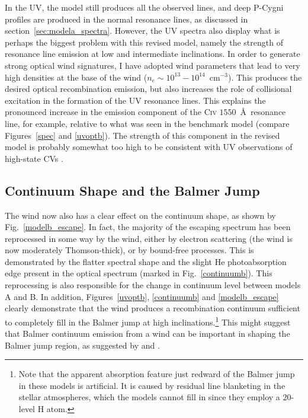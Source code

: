 In the UV, the model still produces all the observed lines, 
and deep P-Cygni profiles are produced in the normal resonance lines,
as discussed in section~\ref{sec:modela_spectra}. However, the UV spectra also
display what is perhaps the biggest problem with this revised model,
namely the strength of resonance line emission 
at low and intermediate inclinations.
In order to generate strong optical wind signatures, I have adopted wind
parameters that lead to very high densities at the base of the wind
($n_e\sim10^{13}-10^{14}$~cm$^{-3}$). This produces
the desired optical recombination emission, but also increases the
role of collisional excitation in the formation of the UV resonance
lines. This explains the pronounced increase in the emission component 
of the C\textsc{iv} $1550$~\AA\ resonance line, for example, relative to
what was seen in the benchmark model (compare Figures~\ref{spec} and
\ref{uvoptb}). The strength of this component in the revised model 
is probably somewhat too high to be consistent with UV observations 
of high-state CVs \citep[see e.g.][]{long1991,long1994, noebauer}.


\subsection{Continuum Shape and the Balmer Jump}

The wind now also has a clear effect on the continuum shape,
as shown by Fig.~\ref{modelb_escape}. In fact, the majority of the
escaping spectrum has been reprocessed in some way by the wind,
either by electron scattering (the wind is now moderately Thomson-thick),
or by bound-free processes. This is demonstrated by the flatter spectral shape
and the slight He photoabsorption edge present in the optical spectrum 
(marked in Fig.~\ref{continuumb}). This reprocessing is also
responsible for the change in continuum level between models A and B.
In addition, Figures~\ref{uvoptb}, \ref{continuumb} 
and \ref{modelb_escape} clearly demonstrate that the wind produces
a recombination continuum sufficient to completely fill in the Balmer jump
at high inclinations.\footnote{Note that the apparent absorption feature 
just redward of the Balmer jump in these models is artificial. It is
caused by residual line blanketing in the stellar atmospheres, which
the models cannot fill in since they employ a 20-level H atom.}
This might suggest that Balmer continuum emission from a wind can be important 
in shaping the Balmer jump region, as
suggested by \cite{KLWB98} and \cite{hassall}.

